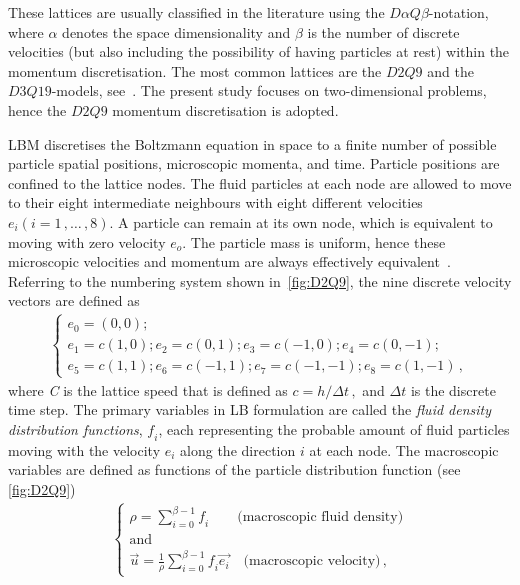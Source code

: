 These lattices are usually classified in the literature using the 
$\mathit{D}\alpha\mathit{Q}\beta$-notation, where $\alpha$ denotes the space 
dimensionality and $\beta$ is the number of discrete velocities (but also 
including the possibility of having particles at rest) within the momentum 
discretisation. The most common lattices are the $\mathit{D2Q9}$ and the 
$\mathit{D3Q19}$-models, see~\citet{He1997}. The present study focuses on 
two-dimensional problems, hence the $\mathit{D2Q9}$ momentum discretisation is 
adopted.

LBM discretises the Boltzmann equation in space to a finite number of possible 
particle spatial positions, microscopic momenta, and time. Particle positions 
are confined to the lattice nodes. The fluid particles at each node are 
allowed to move to their eight intermediate neighbours with eight different 
velocities $\mathit{e_i} (\mathit{i}=1\,,\dots\,,8)$. A particle can remain at 
its own node, which is equivalent to moving with zero velocity $\mathit{e_o}$. 
The particle mass is uniform, hence these microscopic velocities and momentum 
are always effectively equivalent~\citep{Han2007a}. Referring to the numbering 
system shown in~\cref{fig:D2Q9}, the nine discrete velocity vectors are 
defined as
%
\begin{align} 
	\begin{cases}
	\mathit{e_0}=(0,0);\\
	\mathit{e_1}=\mathit{c}(1,0); \mathit{e_2}=\mathit{c}(0,1); 
	\mathit{e_3}=\mathit{c}(-1,0); \mathit{e_4}=\mathit{c}(0,-1); \\
	\mathit{e_5}=\mathit{c}(1,1); \mathit{e_6}=\mathit{c}(-1,1);  
	\mathit{e_7}=\mathit{c}(-1,-1); \mathit{e_8}=\mathit{c}(1,-1)\,, 
	\end{cases}
\end{align}
%
\noindent where \textit{C} is the lattice speed that is defined as 
$\mathit{c}=\mathit{h}/\Delta t \,,$ and $\Delta \mathit{t}$ is the discrete 
time step. The primary variables in LB formulation are called the \textit{fluid 
density distribution functions}, $\mathit{f_i}$, each representing the probable 
amount of fluid particles moving with the velocity $\mathit{e_i}$ along the 
direction $\mathit{i}$ at each node. The macroscopic variables are defined 
as functions of the particle distribution function (see \cref{fig:D2Q9})
%
\begin{align} 
	\label{eq:lbm_macroscopic}	
	\begin{cases}
	\rho = \sum\limits_{\mathit{i}=0}^{\beta - 1}{\mathit{f_i}} \qquad 
	\mbox{(macroscopic fluid density)} \\ 
	\mbox{and}\\
	\overrightarrow{\mathit{u}} = \frac{1}{\rho} 
	\sum\limits_{\mathit{i}=0}^{\beta 
	-1}{\mathit{f_i}\overrightarrow{\mathit{e_i}}} \quad \mbox{(macroscopic 
	velocity)}\,,
	\end{cases}	
\end{align} 
